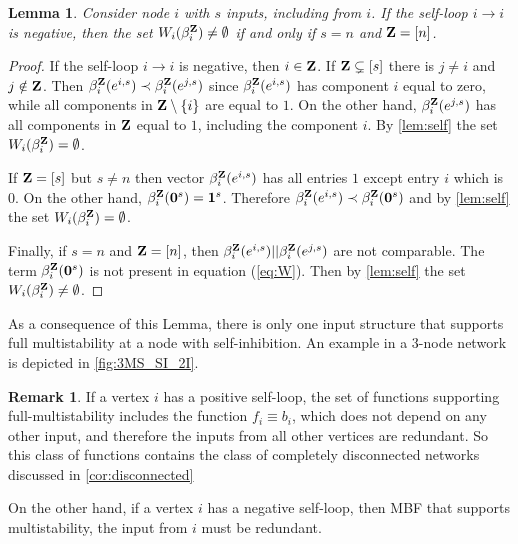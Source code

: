 \documentclass[12pt]{amsart}
\newcommand{\bZ}{{\bf Z}}
\newcommand{\bzero}{{\bf 0}}
\newcommand{\bone}{{\bf 1}}
\newtheorem{lem}[thm]{Lemma}
\theoremstyle{definition}
\newtheorem{rem}[thm]{Remark}
\begin{document}
\begin{lem} \label{lem:neg_self}
    Consider node $i$ with $s$ inputs, including from $i$. If the self-loop $i\to i$ is negative, then the set $W_i(\beta_i^{\bZ}) \not= \emptyset$ if and only if $s=n$ and $\bZ=[n]$.
\end{lem}
\begin{proof}
     If the self-loop $i\to i$ is negative, then $i\in \bZ$. If $\bZ\subsetneq [s]$ there is $j\not = i$ and $j \notin \bZ$. Then  $\beta_i^{\bZ}(e^{i,s}) \prec  \beta_i^{\bZ}(e^{j,s})$ since $\beta_i^{\bZ}(e^{i,s})$ has component $i$ equal to zero, while all components in $\bZ\setminus \{i\}$ are equal to $1$. On the other hand, $\beta_i^{\bZ}(e^{j,s})$ has all components in $\bZ$ equal to $1$, including the component $i$. 
     By \cref{lem:self} the set $W_i(\beta_i^{\bZ}) = \emptyset$. 
     
    If $\bZ=[s]$ but $s \not = n$ then vector 
    $ \beta_i^{\bZ}(e^{i,s})$ has all entries $1$ except entry $i$ which is $0$. On the other hand, $\beta_i^{\bZ}(\bzero^s) = \bone^s$.
    Therefore $\beta_i^{\bZ}(e^{i,s}) \prec \beta_i^{\bZ}(\bzero^s)$ and 
    by \cref{lem:self} the set $W_i(\beta_i^{\bZ}) = \emptyset$. 
    
    Finally, if $s = n$ and $\bZ=[n]$, then 
    $\beta_i^{\bZ}(e^{i,s}) || \beta_i^{\bZ}(e^{j,s})$ are not comparable. The term $\beta_i^{\bZ}(\bzero^s)$ is not present in equation (\ref{eq:W}). Then by \cref{lem:self} the set $W_i(\beta_i^{\bZ}) \not = \emptyset$.
\end{proof}
As a consequence of this Lemma, there is only one input structure that supports full multistability at a node with self-inhibition. An example in a 3-node network is depicted in
\cref{fig:3MS_SI_2I}.

\begin{rem}
    If a vertex $i$ has a positive self-loop, the set of functions supporting full-multistability includes the function $f_i \equiv b_i$, which does not depend on any other input, and therefore the inputs from all other vertices are redundant. So this class of functions contains the class of completely disconnected networks discussed in \cref{cor:disconnected}
    
    On the other hand, if a vertex $i$ has a negative self-loop, then MBF that supports multistability, the input from $i$ must be redundant.
\end{rem}
\end{document}
